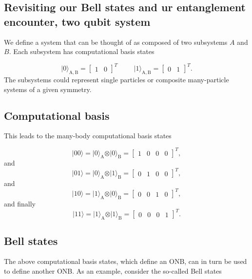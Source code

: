 \documentclass[%
oneside,                 %
final,                   %
10pt]{article}
\begin{document}
\subsection{Revisiting our Bell states and ur  entanglement encounter, two qubit system}

We define a system that can be thought of as composed of two subsystems
$A$ and $B$. Each subsystem has computational basis states

\[
\vert 0\rangle_{\mathrm{A,B}}=\begin{bmatrix} 1 & 0\end{bmatrix}^T \hspace{1cm} \vert 1\rangle_{\mathrm{A,B}}=\begin{bmatrix} 0 & 1\end{bmatrix}^T.
\]
The subsystems could represent single particles or composite many-particle systems of a given symmetry.

\subsection{Computational basis}
This leads to the many-body computational basis states

\[
\vert 00\rangle = \vert 0\rangle_{\mathrm{A}}\otimes \vert 0\rangle_{\mathrm{B}}=\begin{bmatrix} 1 & 0 & 0 &0\end{bmatrix}^T,
\]
and
\[
\vert 01\rangle = \vert 0\rangle_{\mathrm{A}}\otimes \vert 1\rangle_{\mathrm{B}}=\begin{bmatrix} 0 & 1 & 0 &0\end{bmatrix}^T,
\]
and
\[
\vert 10\rangle = \vert 1\rangle_{\mathrm{A}}\otimes \vert 0\rangle_{\mathrm{B}}=\begin{bmatrix} 0 & 0 & 1 &0\end{bmatrix}^T,
\]
and finally
\[
\vert 11\rangle = \vert 1\rangle_{\mathrm{A}}\otimes \vert 1\rangle_{\mathrm{B}}=\begin{bmatrix} 0 & 0 & 0 &1\end{bmatrix}^T.
\]

\subsection{Bell states}

The above computational basis states, which define an ONB, can in turn
be used to define another ONB. As an example, consider the so-called
Bell states
\end{document}
